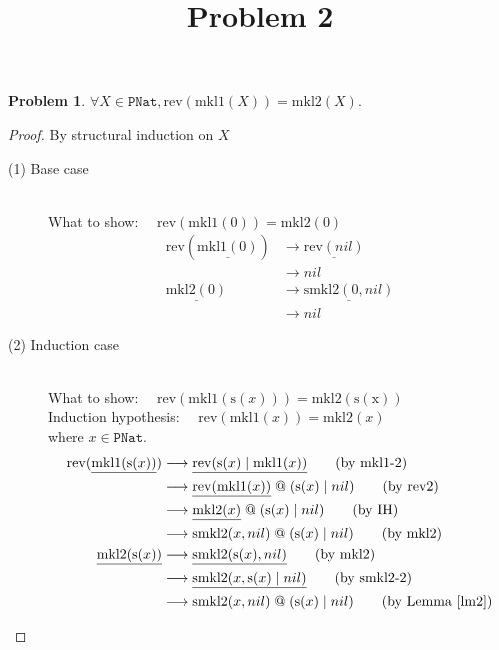 \documentclass[12pt, a4paper]{article}
\title{Problem 2}
\date{\vspace{-5ex}}
\newtheorem{problem}{Problem}
\newcommand{\rel}[1]{\mathrel{#1}}
\newcommand{\rmx}[1]{\mathrm{#1}}
\newcommand{\larrow}{\longrightarrow}
\newcommand{\under}{\underline}
\begin{document}
\maketitle

\begin{problem}
$\forall X \in \mathtt{PNat}, \rmx{rev}(\rmx{mkl1}(X)) = \rmx{mkl2}(X).$
\end{problem}
\begin{proof}
By structural induction on $X$

\begin{description}

\item[(1) Base case]~\\
\noindent
What to show: $\quad\rmx{rev}(\rmx{mkl1}(0)) = \rmx{mkl2}(0)$
\begin{align*}
\rmx{rev}(\under{\rmx{mkl1}(0)}) &\larrow \under{\rmx{rev}(nil)} \tag{by mkl1-1} \\
	&\larrow nil \tag{by rev1} \\
\under{\rmx{mkl2}(0)} &\larrow \under{\rmx{smkl2}(0, nil)} \tag{by mkl2} \\
	&\larrow nil \tag{by smkl2-1}
\end{align*}

\item[(2) Induction case]~\\
What to show: $\quad\rmx{rev}(\rmx{mkl1}(\rmx{s}(x))) = \rmx{mkl2(s(x))}$ \\
Induction hypothesis: $\quad \rmx{rev}(\rmx{mkl1}(x)) = \rmx{mkl2}(x)$ \\
where $x \in \mathtt{PNat}$.
\begin{align*}
\rmx{rev}(\under{\rmx{mkl1}(\rmx{s}(x))}) 
	&\larrow \under{\rmx{rev}(\rmx{s}(x) \rel{|} \rmx{mkl1}(x))} \tag{by mkl1-2} \\
	&\larrow  \under{\rmx{rev}(\rmx{mkl1}(x))} \rel{@} (\rmx{s}(x) \rel{|} nil)  \tag{by rev2} \\
	&\larrow \under{\rmx{mkl2}(x)} \rel{@} (\rmx{s}(x) \rel{|} nil)  \tag{by IH} \\
	&\larrow \rmx{smkl2}(x, nil) \rel{@} (\rmx{s}(x) \rel{|} nil)  \tag{by mkl2} \\
\under{\rmx{mkl2}(\rmx{s}(x))} 
	&\larrow \under{\rmx{smkl2}(\rmx{s}(x), nil)} \tag{by mkl2} \\
	&\larrow \under{\rmx{smkl2}(x, \rmx{s}(x) \rel{|} nil)} \tag{by smkl2-2} \\
	&\larrow \rmx{smkl2}(x, nil) \rel{@} (\rmx{s}(x) \rel{|} nil) \tag{by Lemma~\ref{lm2}}
\end{align*}

\end{description}
\end{proof}
\end{document}
